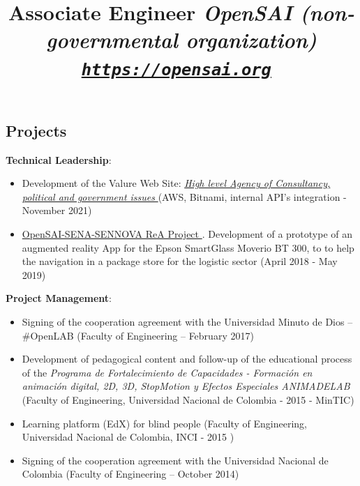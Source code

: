 \documentclass[overlapped,line,final]{../../templates/MichaelDeCorteCV/lib/res}
\begin{document}
\begin{resume}
\vspace{0.5cm}
\section{\sc Projects } %
\vspace{0.5cm}
\title{\bf Associate Engineer
	\em OpenSAI (non-governmental organization)
	{\tt \url {https://opensai.org} } 
}
\begin{position}
	\textbf{Technical Leadership}:
	\begin{itemize}
		\item Development of the Valure Web Site: \href{https://valure.com.co}{\textit{High level Agency of Consultancy, political and government issues} } (AWS, Bitnami, internal API's integration - November 2021)
		\item \href{https://rea.opensai.org/}{OpenSAI-SENA-SENNOVA ReA Project }. Development of a prototype of an augmented reality App for the Epson SmartGlass Moverio BT 300, to to help the navigation in a package store for the logistic sector (April 2018 - May 2019)
	\end{itemize}
	\textbf{Project Management}:
	\begin{itemize}
		\item Signing of the cooperation agreement with the Universidad Minuto de Dios – \#OpenLAB (Faculty of Engineering – February 2017)		
		\item Development of pedagogical content and follow-up of the educational process of the \textit{Programa de Fortalecimiento de Capacidades - Formación en animación digital, 2D, 3D, StopMotion y Efectos Especiales ANIMADELAB} (Faculty of Engineering, Universidad Nacional de Colombia - 2015 - MinTIC)
		\item Learning platform (EdX) for blind people (Faculty of Engineering, Universidad Nacional de Colombia, INCI - 2015 )
		\item Signing of the cooperation agreement with the Universidad Nacional de Colombia (Faculty of Engineering – October 2014)
	\end{itemize}

\end{position}
\end{resume}
\end{document}
